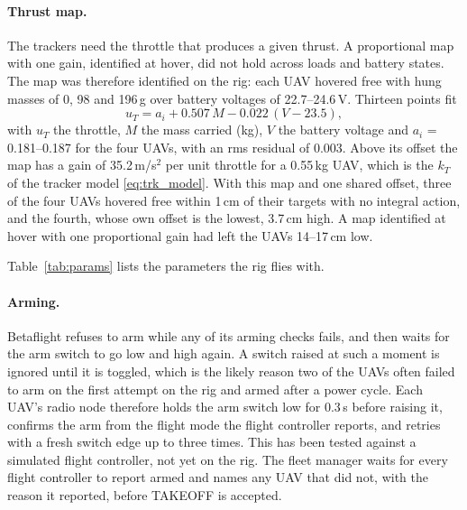 \paragraph{Thrust map.} The trackers need the throttle that produces a given thrust. A proportional
map with one gain, identified at hover, did not hold across loads and battery states. The map was
therefore identified on the rig: each UAV hovered free with hung masses of 0, 98 and 196\,g over
battery voltages of 22.7--24.6\,V. Thirteen points fit
\begin{equation}
    u_T = a_i + 0.507\,M - 0.022\,(V - 23.5),
\end{equation}
with $u_T$ the throttle, $M$ the mass carried (kg), $V$ the battery voltage and $a_i$ = 0.181--0.187
for the four UAVs, with an rms residual of 0.003. Above its offset the map has a gain of 35.2\,m/s$^2$
per unit throttle for a 0.55\,kg UAV, which is the $k_T$ of the tracker model \eqref{eq:trk_model}.
With this map and one shared offset, three of the four UAVs hovered free within 1\,cm of their targets
with no integral action, and the fourth, whose own offset is the lowest, 3.7\,cm high. A map
identified at hover with one proportional gain had left the UAVs 14--17\,cm low.

Table~\ref{tab:params} lists the parameters the rig flies with.

\begin{table}[htbp]
\centering
\caption{Rig parameters, from the rig's launch profile. The rig-twin simulations use the same values.}
\label{tab:params}

\end{table}

\paragraph{Arming.} Betaflight refuses to arm while any of its arming checks fails, and then waits
for the arm switch to go low and high again. A switch raised at such a moment is ignored until it is
toggled, which is the likely reason two of the UAVs often failed to arm on the first attempt on the
rig and armed after a power cycle. Each UAV's radio node therefore holds the arm switch low for
0.3\,s before raising it, confirms the arm from the flight mode the flight controller reports, and
retries with a fresh switch edge up to three times. This has been tested against a simulated flight
controller, not yet on the rig. The fleet manager waits
for every flight controller to report armed and names any UAV that did not, with the reason it
reported, before TAKEOFF is accepted.

